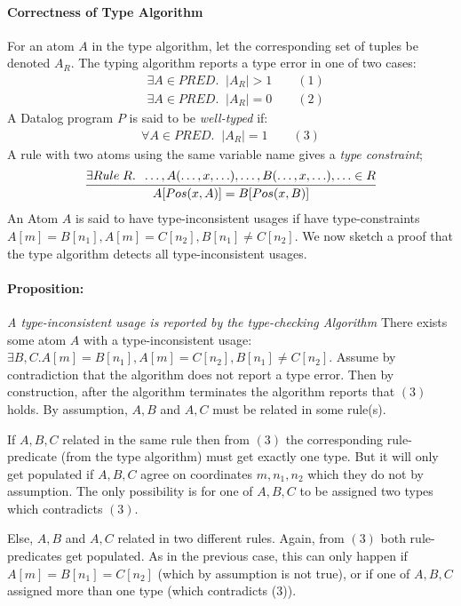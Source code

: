 \paragraph{Correctness of Type Algorithm}\NL
For an atom $A$ in the type algorithm, let the corresponding set of tuples be denoted $A_R$. The typing algorithm reports a type error in one of two cases:
\begin{align*}
&\exists A \in PRED.\;\;|A_R| > 1 \quad\quad (1)\\
&\exists A \in PRED.\;\;|A_R| = 0 \quad\quad (2)
\end{align*}
\noindent
A Datalog program $P$ is said to be \textit{well-typed} if:
\begin{align*}
\forall A \in PRED. \;\; |A_R| = 1 \quad\quad (3)
\end{align*}
A rule with two atoms using the same variable name gives a \textit{type constraint};
\begin{align*}
\infer{A[Pos(x, A)] = B[Pos(x, B)]}{\exists Rule\;R.\;\;\ldots, A( \ldots, x, \ldots), \ldots, B(\ldots, x, \ldots), \ldots \in R}
\end{align*}
\noindent
An Atom $A$ is said to have type-inconsistent usages if have type-constraints $A[m] = B[n_1], A[m] = C[n_2], B[n_1] \neq C[n_2]$. We now sketch a proof that the type algorithm detects all type-inconsistent usages.

\paragraph{Proposition: } \textit{A type-inconsistent usage is reported by the type-checking Algorithm}\NL
There exists some atom $A$ with a type-inconsistent usage: $\exists B, C. A[m] = B[n_1], A[m] = C[n_2], B[n_1] \neq C[n_2]$. Assume by contradiction that the algorithm does not report a type error. Then by construction, after the algorithm terminates the algorithm reports that $(3)$ holds. By assumption, $A, B$ and $A, C$ must be related in some rule(s). 

If $A,B,C$ related in the same rule then from $(3)$ the corresponding rule-predicate (from the type algorithm) must get exactly one type. But it will only get populated if $A,B,C$ agree on coordinates $m, n_1, n_2$ which they do not by assumption. The only possibility is for one of $A,B,C$ to be assigned two types which contradicts $(3)$.

Else, $A,B$ and $A,C$ related in two different rules. Again, from $(3)$ both rule-predicates get populated. As in the previous case, this can only happen if $A[m] = B[n_1] = C[n_2]$ (which by assumption is not true), or if one of $A,B,C$ assigned more than one type (which contradicts (3)). 

